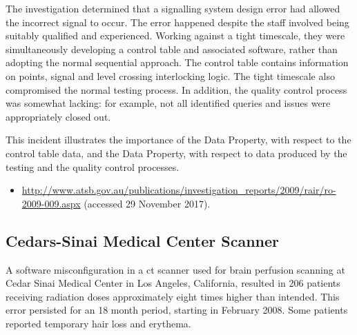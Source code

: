 The investigation determined that a signalling system design error had allowed the incorrect signal to occur. The error happened despite the staff involved being suitably qualified and experienced. Working against a tight timescale, they were simultaneously developing a control table and associated software, rather than adopting the normal sequential approach. The control table contains information on points, signal and level crossing interlocking logic. The tight timescale also compromised the normal testing process. In addition, the quality control process was somewhat lacking: for example, not all identified queries and issues were appropriately closed out.

This incident illustrates the importance of the  Data Property, with respect to the control table data, and the  Data Property, with respect to data produced by the testing and the quality control processes.

\begin{samepage}
\begin{itemize}
	\item \raggedright{\href{http://www.atsb.gov.au/publications/investigation_reports/2009/rair/ro-2009-009.aspx}{http://www.atsb.gov.au/publications/investigation\_reports/2009/rair/ro-2009-009.aspx} (accessed 29 November 2017).}
\end{itemize}
\end{samepage}


\subsection{\protect Cedars-Sinai Medical Center\protect{} Scanner} \label{bkm:incacc:cedarssinai}
A software misconfiguration in a \gls{ct} scanner used for brain perfusion scanning at Cedar Sinai Medical Center in Los Angeles, California, resulted in 206 patients receiving radiation doses approximately eight times higher than intended. This error persisted for an 18 month period, starting in February 2008. Some patients reported temporary hair loss and erythema. 


